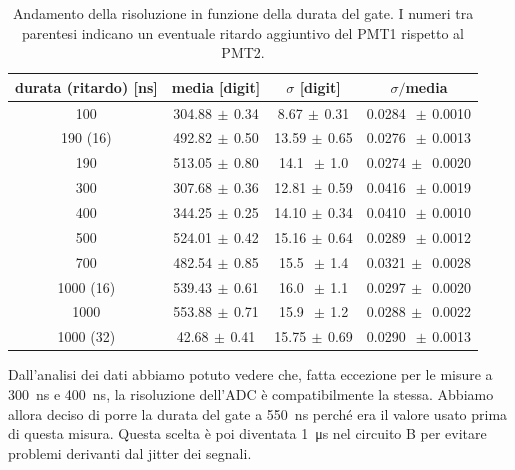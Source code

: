 \begin{table}[h]
\centering
\begin{tabular}{c|c|c|c}
durata (ritardo) [ns] & media [digit] & $\sigma$ [digit] & $\sigma\!/$\!media\\
\hline
 100 &    304.88$\,\pm\,$0.34 &  8.67$\,\pm\,$0.31 & 0.0284 $\,\pm\,$0.0010 \\  
 190 (16)&492.82$\,\pm\,$0.50 & 13.59$\,\pm\,$0.65 & 0.0276 $\,\pm\,$0.0013 \\
 190 &    513.05$\,\pm\,$0.80 & 14.1 $\,\pm\,$1.0 & 0.0274$\,\pm\,$  0.0020 \\
 300 &    307.68$\,\pm\,$0.36 & 12.81$\,\pm\,$0.59 & 0.0416 $\,\pm\,$0.0019 \\
 400 &    344.25$\,\pm\,$0.25 & 14.10$\,\pm\,$0.34 & 0.0410 $\,\pm\,$0.0010 \\
 500 &    524.01$\,\pm\,$0.42 & 15.16$\,\pm\,$0.64 & 0.0289 $\,\pm\,$0.0012 \\
 700 &    482.54$\,\pm\,$0.85 & 15.5 $\,\pm\,$1.4 & 0.0321$\,\pm\,$  0.0028 \\
1000 (16)&539.43$\,\pm\,$0.61 & 16.0 $\,\pm\,$1.1 & 0.0297$\,\pm\,$  0.0020 \\
1000     &553.88$\,\pm\,$0.71 & 15.9 $\,\pm\,$1.2 & 0.0288$\,\pm\,$  0.0022 \\
1000 (32)& 42.68$\,\pm\,$0.41 & 15.75$\,\pm\,$0.69 & 0.0290 $\,\pm\,$0.0013 
\end{tabular}

\caption{Andamento della risoluzione in funzione della durata del gate. I numeri tra parentesi indicano un eventuale ritardo aggiuntivo del PMT1 rispetto al PMT2.}
\label{tab:gate}
\end{table}

Dall'analisi dei dati abbiamo potuto vedere che, fatta eccezione per le misure a \SI{300}{ns} e \SI{400}{ns}, la risoluzione dell'ADC è compatibilmente la stessa.
Abbiamo allora deciso di porre la durata del gate a \SI{550}{ns} perché era il valore usato prima di questa misura.
Questa scelta è poi diventata \SI{1}{\micro s} nel circuito B per evitare problemi derivanti dal jitter dei segnali.